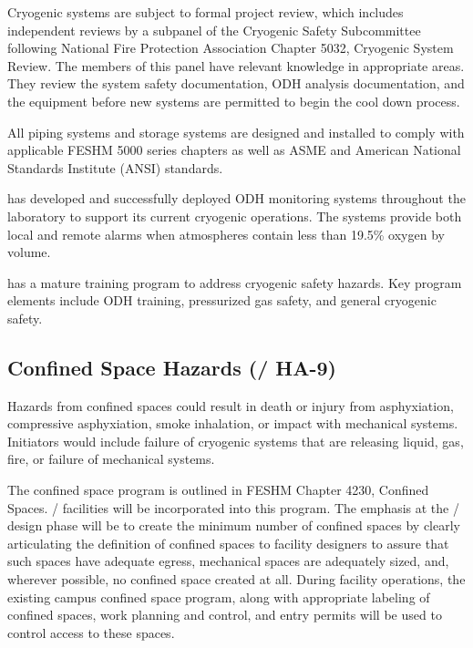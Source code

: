 Cryogenic systems are subject to formal project review,
which includes independent reviews by a subpanel of the Cryogenic
Safety Subcommittee following National Fire Protection Association Chapter 5032, Cryogenic
System Review. The members of this panel have relevant knowledge in appropriate areas. They review the system safety
documentation, ODH  analysis documentation, and the equipment before
new systems are permitted to begin the cool down process.

All piping systems and storage systems are designed and installed
to comply with applicable FESHM 5000 series chapters as well as ASME and
American National Standards Institute (ANSI) standards.

\fnal has developed and successfully deployed ODH monitoring systems throughout the laboratory to support its current cryogenic operations. The systems provide both local and remote alarms when atmospheres contain less than 19.5\% oxygen by volume.

\fnal has a mature training program to address cryogenic safety
hazards. Key program elements include ODH training, pressurized gas
safety, and general cryogenic safety.


\subsection{Confined Space Hazards (/ HA-9)}

Hazards from confined spaces could result in death or injury from
asphyxiation, compressive asphyxiation, smoke inhalation, or impact
with mechanical systems. Initiators would include failure of cryogenic systems that are releasing liquid, gas, fire, or
failure of mechanical systems.

The \fnal confined space program is outlined in FESHM Chapter 4230,
Confined Spaces. / facilities will be incorporated into this
program. The emphasis at the / design phase will be to create 
the minimum number of confined spaces by clearly articulating the definition of confined
spaces to facility designers to assure that such spaces have adequate egress, mechanical spaces are adequately sized, and,
wherever possible, no confined space created at all. During facility
operations, the existing campus confined space program, along with
appropriate labeling of confined spaces, work planning and control,
and entry permits will be used to control access to these spaces.


